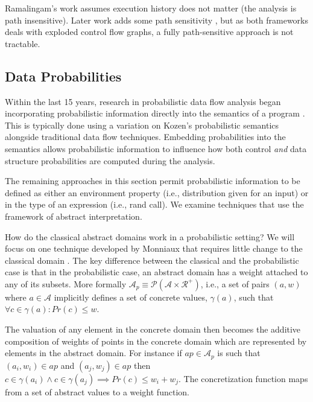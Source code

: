 
Ramalingam's work assumes execution history does not matter 
(the analysis is path insensitive).
Later work adds some path sensitivity \cite{mehofer2001novel}, 
but as both frameworks deals with exploded control flow graphs, a fully 
path-sensitive approach is not tractable.

\subsection{Data Probabilities}

Within the last 15 years, research in probabilistic data flow analysis
began incorporating probabilistic information directly into
the semantics of a program \cite{monniaux2000abstract}.
This is typically done using a variation on Kozen's 
probabilistic semantics \cite{kozen1981semantics} 
alongside traditional data flow techniques.
Embedding probabilities into the semantics allows probabilistic
information to influence how both control {\sl and} data structure
probabilities are computed during the analysis.

The remaining approaches in this section permit probabilistic
information to be defined as either an environment property
(i.e., distribution given for an input) or in the type of
an expression (i.e., rand call).
We examine techniques that use the framework of abstract
interpretation.

How do the classical abstract domains work in a
probabilistic setting?
We will focus on one technique developed by Monniaux
that requires little change to the classical domain 
\cite{monniaux2001backwards}.
The key difference between the classical and the probabilistic 
case is that in the probabilistic case, 
an abstract domain has a weight attached to any of its subsets.
More formally
$\mathcal{A}_p \equiv \mathcal{P}(\mathcal{A} \times \mathcal{R}^+)$, 
i.e., a set of pairs $(a,w)$ where $a \in \mathcal{A}$ implicitly
defines a set of concrete values, $\gamma(a)$, such that
$\forall c \in \gamma(a) : Pr(c) \le w$.

The valuation of any element in the concrete domain then 
becomes the additive composition of weights of points in 
the concrete domain which are represented by elements in
the abstract domain.
For instance if $ap \in \mathcal{A}_p$ is such that
$(a_i,w_i) \in ap$ and 
$(a_j,w_j) \in ap$ then $c \in \gamma(a_i) \wedge
c \in \gamma(a_j) \implies Pr(c) \le w_i + w_j$.
The concretization function maps from a set of abstract
values to a weight function.

